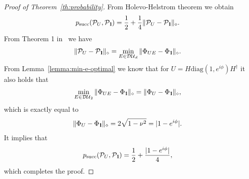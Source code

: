 \documentclass[preprint,12pt, a4paper]{elsarticle}
\newcommand{\1}{{\rm 1\hspace{-0.9mm}l}}
\newcommand{\Id}{{\rm 1\hspace{-0.9mm}l}}
\newcommand{\PP}{\mathcal{P}}
\newcommand{\diaguni}{\ensuremath{\mathcal{DU}}}
\newcommand{\diag}{\mathrm{diag}}
\begin{document}
\begin{proof}[Proof of Theorem~\ref{th:probability}]
	From Holevo-Helstrom theorem we obtain
	\begin{equation}
	p_{\text{succ}}(\PP_{U}, \PP_{\Id}) = \frac{1}{2} + \frac{1}{4} \| \PP_{U} - \PP_{\Id} \|_\diamond.
	\end{equation}
	From Theorem 1 in~\cite{puchala2018strategies} we have 
	\begin{equation}
	\|\PP_U - \PP_\Id\|_\diamond = \min_{E \in \diaguni_d} \|\Phi_{UE} - 
	\Phi_\Id\|_\diamond. 
	\end{equation}
	From Lemma~\ref{lemma:min-e-optimal} we know that for 
	$U =  H \diag(1, e^{i \phi}) H^\dagger$ it also holds that
	\begin{equation}
	\min_{E \in \diaguni_2} \|\Phi_{UE} - 
	\Phi_\Id\|_\diamond = \|\Phi_{U} - 
	\Phi_\Id\|_\diamond,
	\end{equation} which is exactly equal to 
	\begin{equation}
	\|\Phi_{U} - 
	\Phi_\Id\|_\diamond = 2\sqrt{1 - \nu^2} = |1-e^{i   \phi }|. 
	\end{equation}
	It implies that
	\begin{equation}
	p_{\text{succ}}(\PP_{U}, \PP_{\Id}) = \frac{1}{2} + \frac{|1-e^{i \phi}|}{4},
	\end{equation} which completes the proof.
\end{proof} 
\end{document}
